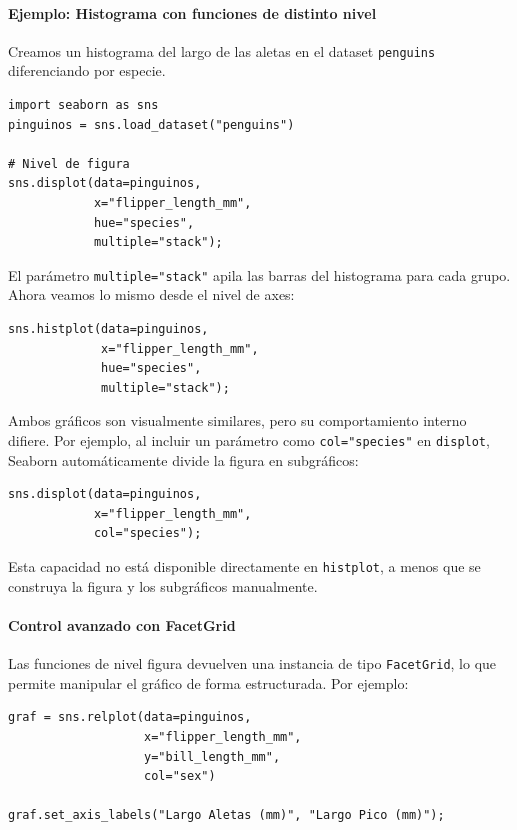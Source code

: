 \documentclass{article}
\theoremstyle{nonumberplain}
\begin{document}
\paragraph{Ejemplo: Histograma con funciones de distinto nivel}

Creamos un histograma del largo de las aletas en el dataset \texttt{penguins} diferenciando por especie.

\begin{verbatim}
import seaborn as sns
pinguinos = sns.load_dataset("penguins")

# Nivel de figura
sns.displot(data=pinguinos,
            x="flipper_length_mm",
            hue="species",
            multiple="stack");
\end{verbatim}

El parámetro \texttt{multiple="stack"} apila las barras del histograma para cada grupo. Ahora veamos lo mismo desde el nivel de axes:

\begin{verbatim}
sns.histplot(data=pinguinos,
             x="flipper_length_mm",
             hue="species",
             multiple="stack");
\end{verbatim}

Ambos gráficos son visualmente similares, pero su comportamiento interno difiere. Por ejemplo, al incluir un parámetro como \texttt{col="species"} en \texttt{displot}, Seaborn automáticamente divide la figura en subgráficos:

\begin{verbatim}
sns.displot(data=pinguinos,
            x="flipper_length_mm",
            col="species");
\end{verbatim}

Esta capacidad no está disponible directamente en \texttt{histplot}, a menos que se construya la figura y los subgráficos manualmente.

\paragraph{Control avanzado con FacetGrid}

Las funciones de nivel figura devuelven una instancia de tipo \texttt{FacetGrid}, lo que permite manipular el gráfico de forma estructurada. Por ejemplo:

\begin{verbatim}
graf = sns.relplot(data=pinguinos,
                   x="flipper_length_mm",
                   y="bill_length_mm",
                   col="sex")

graf.set_axis_labels("Largo Aletas (mm)", "Largo Pico (mm)");
\end{verbatim}
\end{document}
